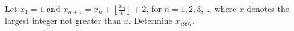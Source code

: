 Let $x_1=1$ and $x_{n+1} =x_n+\left\lfloor \frac{x_n}{n}\right\rfloor +2$,  for $n=1,2,3,\ldots $ where $x$ denotes the largest integer not greater than $x$. Determine $x_{1997}$.
